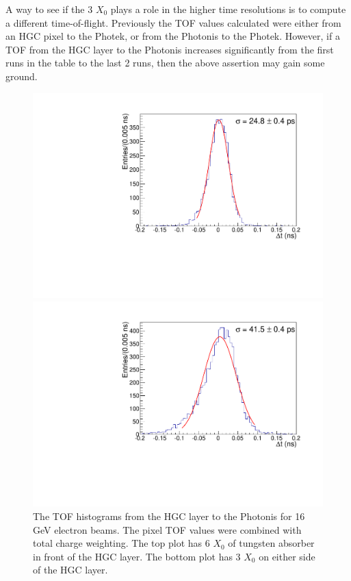 \documentclass[twocolumn,aps,prd,reprint,superscriptaddress,floatfix]{revtex4-1}
\begin{document}
A way to see if the 3 $X_0$ plays a role in the higher time resolutions is to compute a different time-of-flight.
Previously the TOF values calculated were either from an HGC pixel to the Photek, or from the Photonis to the Photek.
However, if a TOF from the HGC layer to the Photonis increases significantly from the first runs in the table to the last 2 runs, then the above assertion may gain some ground.

\begin{figure}[!htbp]
\centering
	\includegraphics[width=\linewidth]{deltaT_PicoSil_vs_MCP_TotalCharge144.pdf}
    
	\includegraphics[width=\linewidth]{deltaT_PicoSil_vs_MCP_TotalCharge186.pdf}
	\caption{The TOF histograms from the HGC layer to the Photonis for 16 GeV electron beams.
	The pixel TOF values were combined with total charge weighting.
	The top plot has 6 $X_0$ of tungsten absorber in front of the HGC layer.
	The bottom plot has 3 $X_0$ on either side of the HGC layer.}
	\label{fig:HGCvsMCP}
\end{figure}
\end{document}
